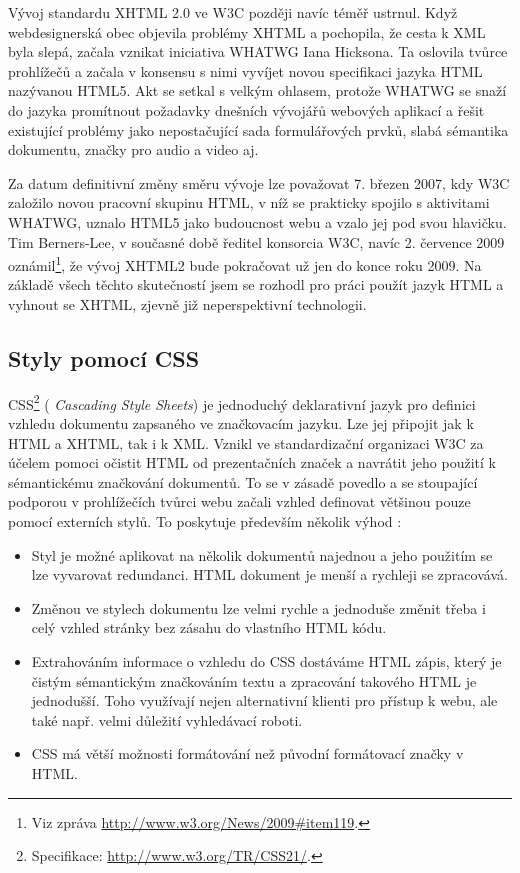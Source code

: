 Vývoj standardu XHTML 2.0 ve W3C později navíc téměř ustrnul. Když
webdesignerská obec objevila problémy XHTML a pochopila, že cesta k
XML byla slepá, začala vznikat iniciativa WHATWG Iana
Hicksona. Ta oslovila tvůrce prohlížečů a začala v konsensu s nimi
vyvíjet novou specifikaci jazyka HTML nazývanou HTML5. Akt se setkal
s velkým ohlasem, protože WHATWG se snaží do jazyka promítnout
požadavky dnešních vývojářů webových aplikací a řešit existující
problémy jako nepostačující sada formulářových prvků, slabá sémantika
dokumentu, značky pro audio a video aj. \cite{whatwg}

Za datum definitivní změny směru vývoje lze považovat 7. březen 2007,
kdy W3C založilo novou pracovní skupinu HTML, v níž se prakticky spojilo
s aktivitami WHATWG, uznalo HTML5 jako budoucnost webu a vzalo
jej pod svou hlavičku. Tim Berners-Lee, v současné době ředitel
konsorcia W3C, navíc 2. července 2009 oznámil\footnote{Viz zpráva
\url{http://www.w3.org/News/2009\#item119}.}, že vývoj XHTML2 bude
pokračovat už jen do konce roku 2009. Na základě všech těchto
skutečností jsem se rozhodl pro práci použít jazyk HTML a vyhnout se
XHTML, zjevně již neperspektivní technologii.

\subsection{Styly pomocí CSS}\label{css}
CSS\footnote{Specifikace: \url{http://www.w3.org/TR/CSS21/}.} ({\it
Cascading Style Sheets}) je jednoduchý deklarativní jazyk pro definici vzhledu dokumentu zapsaného ve značkovacím jazyku. Lze
jej připojit jak k HTML a XHTML, tak i k XML. Vznikl ve
standardizační organizaci W3C za účelem pomoci očistit HTML od
prezentačních značek a navrátit jeho použití k sémantickému
značkování dokumentů. To se v zásadě povedlo a se stoupající podporou
v prohlížečích tvůrci webu začali vzhled definovat většinou pouze
pomocí externích stylů. To poskytuje především několik výhod
\cite{css1}:

\begin{itemize}
	\item Styl je možné aplikovat na několik dokumentů najednou a jeho
	použitím se lze vyvarovat redundanci. HTML dokument je menší a
	rychleji se zpracovává.
	\item Změnou ve stylech dokumentu lze velmi rychle a jednoduše
	změnit třeba i celý vzhled stránky bez zásahu do vlastního HTML
	kódu.
	\item Extrahováním informace o vzhledu do CSS dostáváme HTML zápis,
	který je čistým sémantickým značkováním textu a zpracování takového
	HTML je jednodušší. Toho využívají nejen alternativní klienti pro
	přístup k webu, ale také např. velmi důležití vyhledávací roboti.
	\item CSS má větší možnosti formátování než původní formátovací
	značky v HTML.
\end{itemize}

